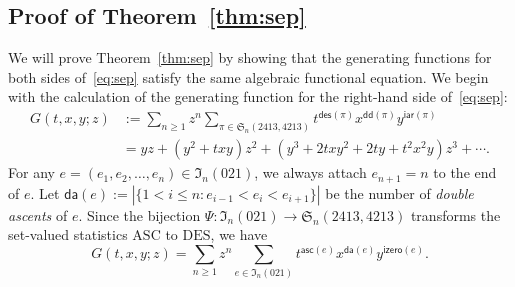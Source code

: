 \documentclass[12pt]{amsart}
\numberwithin{equation}{section}
\theoremstyle{plain}
\theoremstyle{definition}
\newcommand{\I}{\mathfrak{I}}
\def\des{\mathsf{des}}
\def\S{\mathfrak{S}}
\def\iar{\mathsf{iar}}
\def\DES{\mathrm{DES}}
\def\ASC{\mathrm{ASC}}
\def\asc{\mathsf{asc}}
\def\dd{\mathsf{dd}}
\def\izero{\mathsf{izero}}
\def\da{\mathsf{da}}
\begin{document}
\subsection{Proof of Theorem~\ref{thm:sep}} We will prove Theorem~\ref{thm:sep} by showing that the generating functions for both sides of~\eqref{eq:sep} satisfy the same algebraic functional equation. We begin with the calculation of the generating function for the right-hand side of~\eqref{eq:sep}:
\begin{align*}
G(t,x,y;z)&:=\sum_{n\geq1}z^n\sum_{\pi\in\S_n(2413,4213)}t^{\des(\pi)}x^{\dd(\pi)}y^{\iar(\pi)}\\
&=yz+(y^2+txy)z^2+(y^3+2txy^2+2ty+t^2x^2y)z^3+\cdots.
\end{align*}
For any $e=(e_1,e_2,\ldots,e_n)\in\I_n(021)$, we always attach $e_{n+1}=n$ to the end of $e$. Let $\da(e):=|\{1< i\leq n: e_{i-1}<e_i<e_{i+1}\}|$ be the number of {\em double ascents} of $e$. Since the bijection $\Psi:\I_n(021)\rightarrow\S_n(2413,4213)$ transforms the set-valued statistics $\ASC$ to $\DES$, we have 
$$
G(t,x,y;z)=\sum_{n\geq1}z^n\sum_{e\in\I_n(021)}t^{\asc(e)}x^{\da(e)}y^{\izero(e)}. 
$$
\end{document}
